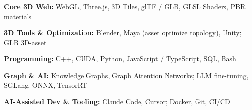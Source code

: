 \begin{onecolentry}
	\textbf{Core 3D Web:} WebGL, Three.js, 3D Tiles, glTF / GLB, GLSL Shaders, PBR materials
\end{onecolentry}
\begin{onecolentry}
	\textbf{3D Tools \& Optimization:} Blender, Maya (asset optimize topology), Unity; GLB 3D-asset
\end{onecolentry}
\begin{onecolentry}
	\textbf{Programming:} C++, CUDA, Python, JavaScript / TypeScript, SQL, Bash
\end{onecolentry}
\begin{onecolentry}
	\textbf{Graph \& AI:} Knowledge Graphs, Graph Attention Networks; LLM fine-tuning, SGLang, ONNX, TensorRT
\end{onecolentry}
\begin{onecolentry}
	\textbf{AI-Assisted Dev \& Tooling:} Claude Code, Cursor; Docker, Git, CI/CD
\end{onecolentry}
